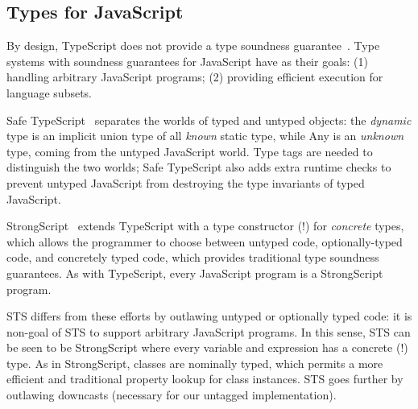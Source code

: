 






\subsection{Types for JavaScript}

By design, TypeScript does not provide a type soundness guarantee~\cite{BiermanAT14}.
Type systems with soundness guarantees for JavaScript have as their
goals: (1) handling arbitrary JavaScript programs;
(2) providing efficient execution for language subsets.

Safe TypeScript~\cite{SafeTypeScript15} separates the worlds of typed and untyped
objects: the \emph{dynamic} type is an implicit union type of all \emph{known} static type,
while Any is an \emph{unknown} type, coming from the untyped JavaScript world. Type tags
are needed to distinguish the two worlds; Safe TypeScript also adds extra runtime checks
to prevent untyped JavaScript from destroying the type invariants of typed JavaScript.

StrongScript~\cite{StrongScriptECOOP15} extends TypeScript with a type constructor (!)
for \emph{concrete} types, which allows the programmer to choose between untyped
code, optionally-typed code, and concretely typed code, which provides traditional
type soundness guarantees. As with TypeScript, every JavaScript program is a StrongScript program.

STS differs from these efforts by outlawing untyped or optionally typed
code: it is non-goal of STS to support arbitrary JavaScript programs.
In this sense, STS can be seen to be StrongScript where every variable and
expression has a concrete (!) type. As in StrongScript, classes are nominally typed,
which permits a more efficient and traditional property lookup for class instances.
STS goes further by outlawing downcasts (necessary for our untagged
implementation).

